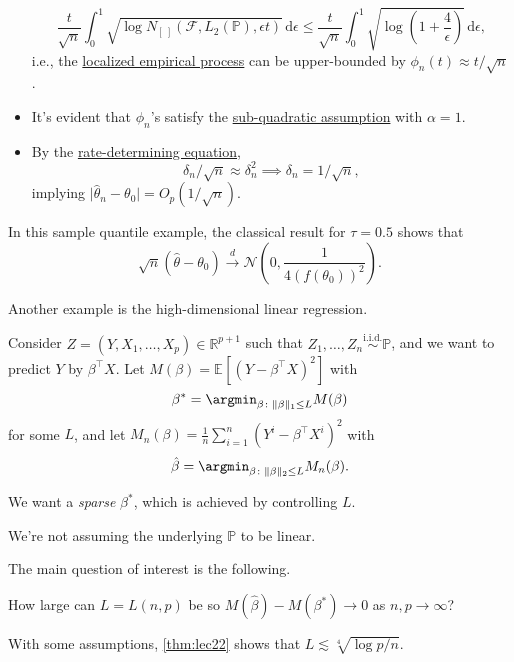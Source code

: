 \begin{explanation}
\begin{itemize}
		      \[
			      \frac{t}{\sqrt{n} } \int_{0}^{1} \sqrt{\log N_{[\ ]}(\mathscr{F} , L_2(\mathbb{P} ), \epsilon t)}  \,\mathrm{d}\epsilon
			      \leq \frac{t}{\sqrt{n} } \int_{0}^{1} \sqrt{\log \left( 1 + \frac{4}{\epsilon } \right) } \,\mathrm{d}\epsilon ,
		      \]
		      i.e., the \hyperref[def:localized-EP]{localized empirical process} can be upper-bounded by \(\phi _n(t) \approx t / \sqrt{n} \).
		\item It's evident that \(\phi _n\)'s satisfy the \hyperref[def:sub-quadratic-assumption]{sub-quadratic assumption} with \(\alpha = 1\).
		\item By the \hyperref[def:rate-determining-equation]{rate-determining equation},
		      \[
			      \delta _n / \sqrt{n} \approx \delta _n^2
			      \implies \delta _n = 1 / \sqrt{n},
		      \]
		      implying \(\vert \hat{\theta} _n - \theta _0 \vert = O_p (1 / \sqrt{n}) \).
	\end{itemize}
\end{explanation}

\begin{remark}
	In this sample quantile example, the classical result for \(\tau = 0.5\) shows that
	\[
		\sqrt{n} (\hat{\theta} - \theta _0) \overset{d}{\to } \mathcal{N} \left( 0, \frac{1}{4 ( f(\theta _0) )^2} \right).
	\]
\end{remark}

Another example is the high-dimensional linear regression.

\begin{eg}\label{eg:high-dim-LR}
	Consider \(Z = (Y, X_1, \dots , X_p) \in \mathbb{R} ^{p + 1}\) such that \(Z_1, \dots , Z_n \overset{\text{i.i.d.} }{\sim } \mathbb{P} \), and we want to predict \(Y\) by \(\beta ^{\top} X\). Let \(M(\beta ) = \mathbb{E}_{}\left[(Y - \beta ^{\top} X) ^2 \right] \) with
	\[
		\beta ^{\ast} = \argmin_{\beta \colon \lVert \beta \rVert _1 \leq L}  M(\beta )
	\]
	for some \(L\), and let \(M_n(\beta ) = \frac{1}{n} \sum_{i=1}^{n} (Y^i - \beta ^{\top} X^i)^2\) with
	\[
		\hat{\beta} = \argmin_{\beta \colon \lVert \beta  \rVert _2 \leq L} M_n(\beta ).
	\]

	\begin{intuition}
		We want a \emph{sparse} \(\beta ^{\ast} \), which is achieved by controlling \(L\).
	\end{intuition}

	\begin{note}
		We're not assuming the underlying \(\mathbb{P} \) to be linear.
	\end{note}

	The main question of interest is the following.

	\begin{problem*}[Persistency]
		How large can \(L = L(n, p)\) be so \(M(\hat{\beta} ) - M(\beta ^{\ast} ) \to 0\) as \(n, p \to \infty \)?
	\end{problem*}
	\begin{answer}
		With some assumptions, \autoref{thm:lec22} shows that \(L \lesssim \sqrt[4]{\log p / n} \).
	\end{answer}
\end{eg}

